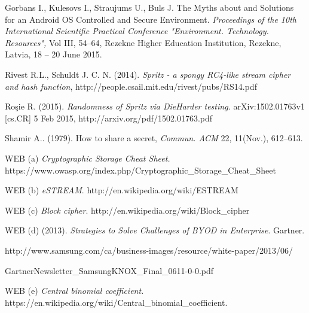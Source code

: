 \documentclass{bjmc}
\begin{document}
\begin{thebibliography}{}		
  Gorbans I.,  Kulesovs I.,  Straujums U.,  Buls J.  The Myths about and Solutions for an Android OS Controlled
and Secure Environment. \textit{Proceedings of the 10th International Scientific Practical Conference
"Environment. Technology. Resources",}  Vol III, 54--64, Rezekne Higher Education Institution,  
Rezekne, Latvia, 18 -- 20 June 2015.

  Rivest R.L.,  Schuldt J. C. N. (2014).
\textit{ Spritz - a spongy RC4-like stream cipher and hash function},   {\ttfamily http://people.csail.mit.edu/rivest/pubs/RS14.pdf}

  Ro\c sie R. (2015). \textit{ Randomness of Spritz via DieHarder testing.}
arXiv:1502.01763v1 [cs.CR] 5 Feb 2015, {\ttfamily http://arxiv.org/pdf/1502.01763.pdf}

  Shamir A.. (1979). {How to share a secret}, \textit{Commun. ACM} 22, 11(Nov.), 612--613.

 WEB (a) \textit{Cryptographic Storage  Cheat Sheet.} \\
  {\ttfamily https://www.owasp.org/index.php/Cryptographic\_Storage\_Cheat\_Sheet}

 WEB (b) \textit{ eSTREAM}.  {\ttfamily http://en.wikipedia.org/wiki/ESTREAM}

 WEB (c) \textit{ Block cipher}. {\ttfamily  http://en.wikipedia.org/wiki/Block\_cipher}

 WEB (d) (2013). \textit{ Strategies to Solve Challenges of BYOD in Enterprise}. Gartner.\\
{\ttfamily http://www.samsung.com/ca/business-images/resource/white-paper/2013/06/\par
GartnerNewsletter\_SamsungKNOX\_Final\_0611-0-0.pdf}

 WEB (e) \textit{Central binomial coefficient.} \\ {\ttfamily https://en.wikipedia.org/wiki/Central\_binomial\_coefficient.}

\end{thebibliography}
\end{document}

